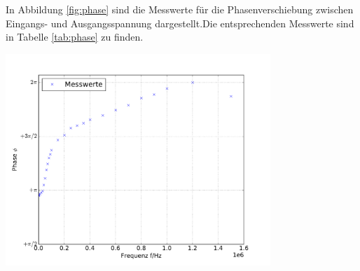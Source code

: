 \documentclass[]{scrartcl}
\begin{document}
In Abbildung \ref{fig:phase} sind die Messwerte für die Phasenverschiebung zwischen Eingangs- und Ausgangsspannung dargestellt.Die entsprechenden Messwerte sind in Tabelle \ref{tab:phase} zu finden.
\begin{center}
	\includegraphics[width=10cm]{images/phase_frequenz.pdf}
	\label{fig:phase}
\end{center}
\end{document}
